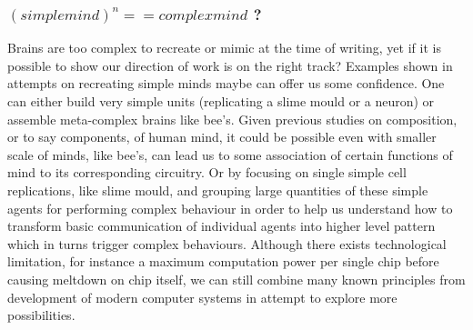 \documentclass[11pt]{article}
\newenvironment{sketch}{\color{dark-green-2}}{\ignorespacesafterend}
\begin{document}
\begin{sketch}
\subsubsection*{ $ (simple mind)^n == complex mind$ ?}
Brains are too complex to recreate or mimic at the time of writing, yet if it is possible to show our direction of work is on the right track? Examples shown in attempts on recreating simple minds maybe can offer us some confidence. One can either build very simple units (replicating a slime mould or a neuron) or assemble meta-complex brains like bee's. Given previous studies on composition, or to say components, of human mind, it could be possible even with smaller scale of minds, like bee's, can lead us to some association of certain functions of mind to its corresponding circuitry. Or by focusing on single simple cell replications, like slime mould, and grouping large quantities of these simple agents for performing complex behaviour in order to help us understand how to transform basic communication of individual agents into higher level pattern which in turns trigger complex behaviours. Although there exists technological limitation, for instance a maximum computation power per single chip before causing meltdown on chip itself, we can still combine many known principles from development of modern computer systems in attempt to explore more possibilities. 
\end{sketch}
\end{document}
